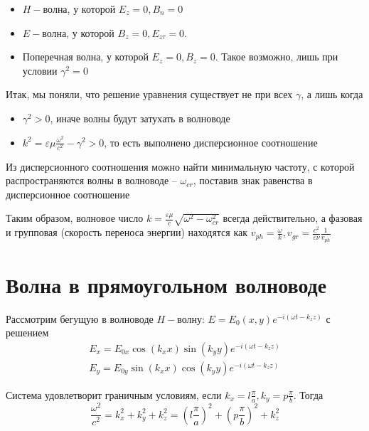 \documentclass[a4paper, 14pt]{article}
\begin{document}
    \begin{itemize}
        \item $H-$волна, у которой $E_z = 0, B_n = 0$
        \item $E-$волна, у которой $B_z = 0, E_{z\tau} = 0$.
        \item Поперечная волна, у которой $E_z = 0, B_z = 0$.
        Такое возможно, лишь при условии $\gamma^2 = 0$
    \end{itemize}
    Итак, мы поняли, что решение уравнения существует не при всех $\gamma$, а лишь когда
    
    \begin{itemize}
        \item $\gamma^2 > 0$, иначе волны будут затухать в волноводе
        \item $k^2 = \varepsilon \mu \frac{\omega^2}{c^2} - \gamma^2 > 0$, то есть выполнено дисперсионное соотношение
    \end{itemize}
    
    Из дисперсионного соотношения можно найти минимальную частоту, с которой распространяются волны в волноводе --
    $\omega_{cr}$, поставив знак равенства в дисперсионное соотношение
    
    Таким образом, волновое число $k = \frac{\varepsilon \mu}{c} \sqrt{\omega^2 - \omega^2_{cr}}$ всегда
    действительно, а фазовая и групповая (скорость переноса энергии) находятся как $v_{ph} =
    \frac{\omega}{k}, v_{gr} = \frac{c^2}{\varepsilon \nu} \frac{1}{v_{ph}}$
    
    \section*{Волна в прямоугольном волноводе} 
    
    Рассмотрим бегущую в волноводе $H-$волну: $E = E_0 (x, y) e^{-i(\omega t - k_z z)}$ с решением
    \begin{gather*}
        E_x = E_{0x} \cos(k_x x) \sin(k_y y) e^{-i(\omega t - k_z z)} \\
        E_y = E_{0y} \sin(k_x x) \cos(k_y y) e^{-i(\omega t - k_z z)}
        \label{eq:}
    \end{gather*}
    
    Система удовлетворит граничным условиям, если $k_x = l \frac{\pi}{a}, k_y = p \frac{\pi}{b}$.
    Тогда
    \[ \frac{\omega^2}{c^2} = k^2_x + k^2_y + k^2_z = \left(l \frac{\pi}{a}\right)^2 + \left(p \frac{\pi}{b}\right)^2 +
    k^2_z \]
    
\end{document}

